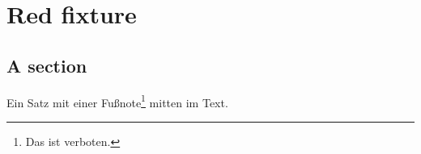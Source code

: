\chapter{Red fixture}\label{c98}

\section{A section}\label{c98.s1}

Ein Satz mit einer Fußnote\footnote{Das ist verboten.} mitten im Text.

